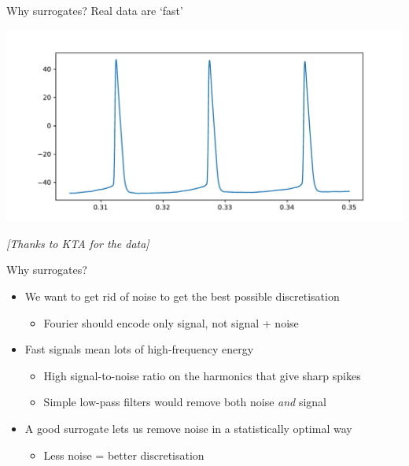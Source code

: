 \documentclass[presentation]{beamer}
\begin{document}
\begin{frame}[label={sec:orgc50c0c5}]{Why surrogates?}
Real data are `fast'
\begin{center}
\includegraphics[width=.9\linewidth]{./fast.pdf}
\end{center}

\begin{center}
\emph{[Thanks to KTA for the data]}
\end{center}
\end{frame}

\begin{frame}[<+->][label={sec:org4ef586f}]{Why surrogates?}
\begin{itemize}
\item We want to get rid of noise to get the best possible discretisation
\begin{itemize}
\item Fourier should encode only signal, not signal + noise
\end{itemize}
\end{itemize}
\vfill
\begin{itemize}
\item Fast signals mean lots of high-frequency energy
\begin{itemize}
\item High signal-to-noise ratio on the harmonics that give sharp spikes
\item Simple low-pass filters would remove both noise \emph{and} signal
\end{itemize}
\end{itemize}
\vfill
\begin{itemize}
\item A good surrogate lets us remove noise in a statistically optimal way
\begin{itemize}
\item Less noise = better discretisation
\end{itemize}
\end{itemize}
\end{frame}
\end{document}
